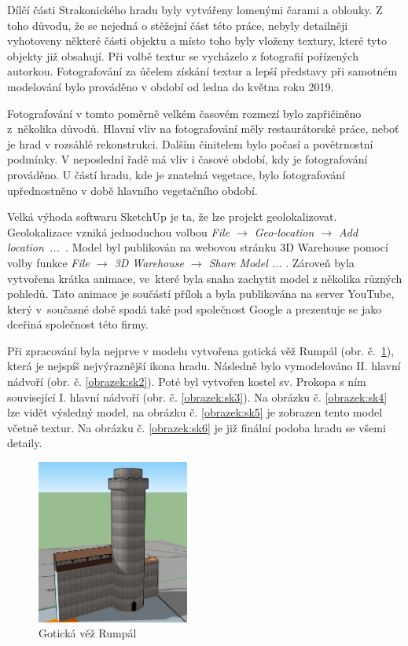 \documentclass[thesis=M,czech]{FITthesis}[2012/06/26]
\begin{document}
Dílčí části Strakonického hradu byly vytvářeny lomenými čarami a oblouky. Z toho důvodu, že se nejedná o stěžejní část této práce, nebyly detailněji vyhotoveny některé části objektu a místo toho byly vloženy textury, které tyto objekty již obsahují. Při volbě textur se vycházelo z fotografií pořízených autorkou. Fotografování za účelem získání textur a lepší představy při samotném modelování bylo prováděno v období od ledna do května roku 2019. 

Fotografování v tomto poměrně velkém časovém rozmezí bylo zapřičiněno z~několika důvodů. Hlavní vliv na fotografování měly restaurátorské práce, neboť je hrad v rozsáhlé rekonstrukci. Dalším činitelem bylo počasí a povětrnostní podmínky. V neposlední řadě má vliv i časové období, kdy je fotografování prováděno. U částí hradu, kde je znatelná vegetace, bylo fotografování upřednostněno v době hlavního vegetačního období.

Velká výhoda softwaru SketchUp je ta, že lze projekt geolokalizovat. Geolokalizace vzniká jednoduchou volbou \textit{File $\rightarrow$ Geo-location $\rightarrow$ Add \mbox{location ... }}. Model byl publikován na webovou stránku 3D Warehouse pomocí volby funkce \textit{File $\rightarrow$ 3D Warehouse $\rightarrow$ Share Model ... }. Zároveň byla vytvořena krátka animace, ve~které byla snaha zachytit model z několika různých pohledů. Tato animace je součástí příloh a byla publikována na server YouTube, který v~současné době spadá také pod společnost Google a prezentuje se jako dceřiná společnost této firmy. 

Při zpracování byla nejprve v modelu vytvořena gotická věž Rumpál (obr. č.~\ref{obrazek:sk1}), která je nejspíš nejvýraznější ikona hradu. Následně bylo vymodelováno II. hlavní nádvoří (obr. č. \ref{obrazek:sk2}). Poté byl vytvořen kostel sv. Prokopa s ním související I. hlavní nádvoří (obr. č. \ref{obrazek:sk3}). Na obrázku č. \ref{obrazek:sk4} lze vidět výsledný model, na obrázku č. \ref{obrazek:sk5} je zobrazen tento model včetně textur. Na obrázku č. \ref{obrazek:sk6} je již finální podoba hradu se všemi detaily.

\begin{figure}[h]
	\centering
	\includegraphics[width=5cm]{pics/sketchup1.png}
	\caption{Gotická věž Rumpál}
	\label{obrazek:sk1}
\end{figure}
\end{document}
